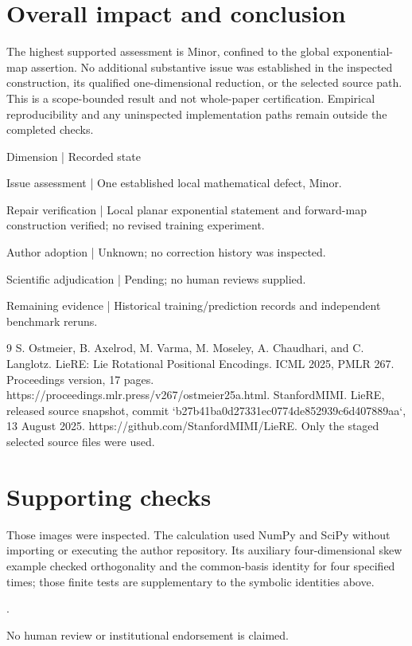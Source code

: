 \documentclass[10pt]{article}
\begin{document}
\section*{Overall impact and conclusion}
The highest supported assessment is Minor, confined to the global exponential-map assertion. No additional substantive issue was established in the inspected construction, its qualified one-dimensional reduction, or the selected source path. This is a scope-bounded result and not whole-paper certification. Empirical reproducibility and any uninspected implementation paths remain outside the completed checks.\par
Dimension | Recorded state\par
Issue assessment | One established local mathematical defect, Minor.\par
Repair verification | Local planar exponential statement and forward-map construction verified; no revised training experiment.\par
Author adoption | Unknown; no correction history was inspected.\par
Scientific adjudication | Pending; no human reviews supplied.\par
Remaining evidence | Historical training/prediction records and independent benchmark reruns.\par
9 S. Ostmeier, B. Axelrod, M. Varma, M. Moseley, A. Chaudhari, and C. Langlotz. LieRE: Lie Rotational Positional Encodings. ICML 2025, PMLR 267. Proceedings version, 17 pages. https://proceedings.mlr.press/v267/ostmeier25a.html. StanfordMIMI. LieRE, released source snapshot, commit `b27b41ba0d27331ec0774de852939c6d407889aa`, 13 August 2025. https://github.com/StanfordMIMI/LieRE. Only the staged selected source files were used.\par
\section*{Supporting checks}
Those images were inspected. The calculation used NumPy and SciPy without importing or executing the author repository. Its auxiliary four-dimensional skew example checked orthogonality and the common-basis identity for four specified times; those finite tests are supplementary to the symbolic identities above.\par
.\par
No human review or institutional endorsement is claimed.\par
\end{document}
